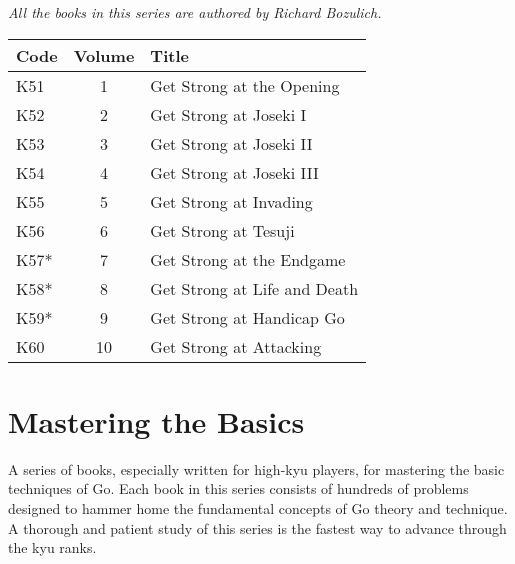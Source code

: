 \bigskip

\emph{All the books in this series are authored by Richard Bozulich.}

\begin{longtable}{l|c|l} 
    \hline
    \textbf{Code} & \textbf{Volume} & \textbf{Title} \\
    \hline \hline
    K51 & 1 & Get Strong at the Opening \\
    \hline
    K52 & 2 & Get Strong at Joseki I \\
    \hline
    K53 & 3 & Get Strong at Joseki II \\
    \hline
    K54 & 4 & Get Strong at Joseki III \\
    \hline
    K55 & 5 & Get Strong at Invading \\
    \hline
    K56 & 6 & Get Strong at Tesuji \\
    \hline
    K57* & 7 & Get Strong at the Endgame \\
    \hline
    K58* & 8 & Get Strong at Life and Death \\
    \hline
    K59* & 9 & Get Strong at Handicap Go \\
    \hline
    K60 & 10 & Get Strong at Attacking \\
    \hline
\end{longtable}

\section{Mastering the Basics}

A series of books, especially written for high-kyu players, for mastering the basic techniques of Go. Each book in this series consists of hundreds of problems designed to hammer home the fundamental concepts of Go theory and technique. A thorough and patient study of this series is the fastest way to advance through the kyu ranks.

